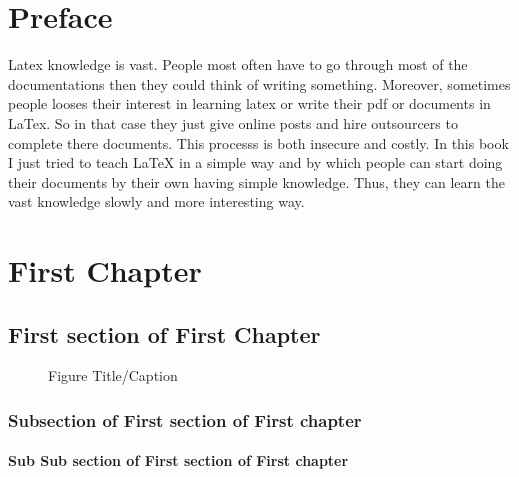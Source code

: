 \documentclass[A4 paper,openany]{book}  %
\begin{document}
\chapter*{Preface}
Latex knowledge is vast. People most often have to go through most of the documentations then they could think of writing something.
Moreover, sometimes people looses their interest in learning latex or write their pdf or documents in LaTex. So in that case they just give online posts
and hire outsourcers to complete there documents. This processs is both insecure and costly. In this book I just tried to teach LaTeX in a simple way and by which
people can start doing their documents by their own having simple knowledge. Thus, they can learn the vast knowledge slowly and more interesting way.

\chapter{First Chapter}
\section{First section of First Chapter}

\begin{figure}[htbp]
    \begin{center}
        \caption{Figure Title/Caption}
    \end{center}
\end{figure}

\subsection{Subsection of First section of First chapter}
\subsubsection{Sub Sub section of First section of First chapter}
\end{document}
